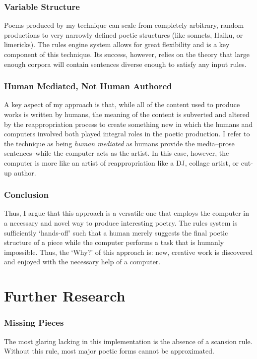 \documentclass[10pt]{article}
\begin{document}
\subsubsection{Variable Structure}
Poems produced by my technique can scale from completely arbitrary, random
productions to very narrowly defined poetic structures (like sonnets, Haiku, or
limericks). The rules engine system allows for great flexibility and is a key
component of this technique. Its success, however, relies on the theory that
large enough corpora will contain sentences diverse enough to satisfy any input
rules.

\subsubsection{Human Mediated, Not Human Authored}
A key aspect of my approach is that, while all of the content used to produce
works is written by humans, the meaning of the content is subverted and altered
by the reappropriation process to create something new in which the humans and
computers involved both played integral roles in the poetic production. I refer
to the technique as being \emph{human mediated} as humans provide the
media--prose sentences--while the computer acts as the artist. In this case,
however, the computer is more like an artist of reappropriation like a DJ,
collage artist, or cut-up author.

\subsubsection{Conclusion}
Thus, I argue that this approach is a versatile one that employs the computer in a
necessary and novel way to produce interesting poetry. The rules system is
sufficiently `hands-off' such that a human merely suggests the final poetic
structure of a piece while the computer performs a task that is humanly
impossible. Thus, the `Why?' of this approach is: new, creative work is
discovered and enjoyed with the necessary help of a computer.

\section{Further Research}
\subsubsection{Missing Pieces}
The most glaring lacking in this implementation is the absence of a scansion
rule. Without this rule, most major poetic forms cannot be approximated.
\end{document}
